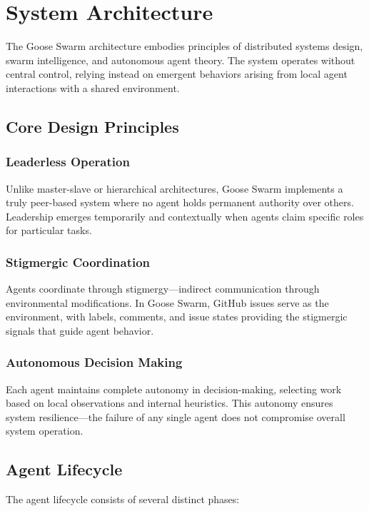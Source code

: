 \documentclass[11pt,a4paper]{article}
\begin{document}
\section{System Architecture}

The Goose Swarm architecture embodies principles of distributed systems design, swarm intelligence, and autonomous agent theory. The system operates without central control, relying instead on emergent behaviors arising from local agent interactions with a shared environment.

\subsection{Core Design Principles}

\subsubsection{Leaderless Operation}
Unlike master-slave or hierarchical architectures, Goose Swarm implements a truly peer-based system where no agent holds permanent authority over others. Leadership emerges temporarily and contextually when agents claim specific roles for particular tasks.

\subsubsection{Stigmergic Coordination}
Agents coordinate through stigmergy—indirect communication through environmental modifications. In Goose Swarm, GitHub issues serve as the environment, with labels, comments, and issue states providing the stigmergic signals that guide agent behavior.

\subsubsection{Autonomous Decision Making}
Each agent maintains complete autonomy in decision-making, selecting work based on local observations and internal heuristics. This autonomy ensures system resilience—the failure of any single agent does not compromise overall system operation.

\subsection{Agent Lifecycle}

The agent lifecycle consists of several distinct phases:
\end{document}

